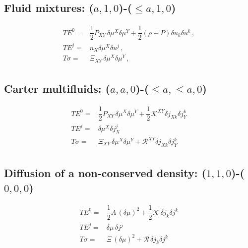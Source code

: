 \documentclass[aps,prl,singlecolumn,nofootinbib]{revtex4-2}
\theoremstyle{definition}
\theoremstyle{theorem}
\begin{document}
\subsection*{Fluid mixtures: ($a,1,0$)-($\leq a, 1,0$)}

\begin{equation}
\begin{split}
TE^0 ={}& \dfrac{1}{2} P_{XY} \, \delta \mu^X \delta \mu^Y + \dfrac{1}{2}(\rho {+} P)\delta u_k \delta u^k \, ,\\
TE^j ={}& n_X \delta \mu^X \delta u^j \, , \\
T\sigma ={}& \Xi_{XY} \, \delta \mu^X \delta \mu^Y \, ,\\
\end{split}
\end{equation}



\subsection*{Carter multifluids: ($a,a,0$)-($\leq a, \leq a,0$)}

\begin{equation}
\begin{split}
TE^0 ={}& \dfrac{1}{2} P_{XY} \, \delta \mu^X \delta \mu^Y + \dfrac{1}{2}\mathcal{K}^{XY}\delta j_{Xk} \delta  j_Y^k \\
TE^j ={}&  \delta \mu^X \delta j_X^j \\
T\sigma ={}& \Xi_{XY} \, \delta \mu^X \delta \mu^Y + \mathcal{R}^{XY} \delta j_{Xk} \delta  j_Y^k\\
\end{split}
\end{equation}




\subsection*{Diffusion of a non-conserved density: ($1,1,0$)-($0, 0,0$)}

\begin{equation}\label{diffusuz}
\begin{split}
TE^0 ={}& \dfrac{1}{2} A \, (\delta \mu)^2 + \dfrac{1}{2}\mathcal{K}\, \delta j_{k} \delta  j^k \\
TE^j ={}&  \delta \mu \, \delta j^j \\
T\sigma ={}& \Xi \, (\delta \mu)^2 + \mathcal{R} \, \delta j_{k} \delta  j^k\\
\end{split}
\end{equation}
\end{document}
